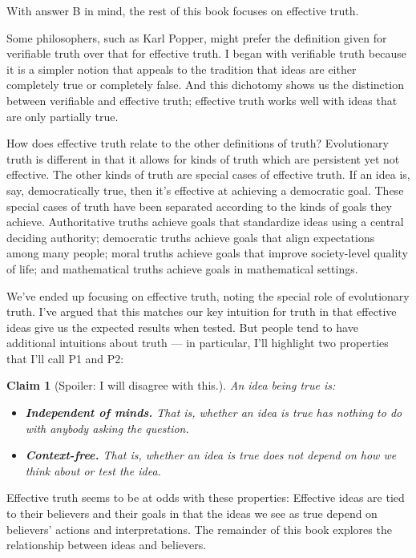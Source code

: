 \documentclass[9pt, twoside]{book}
\newtheorem*{claim}{Claim}
\theoremstyle{argtstyle}
\begin{document}
With answer B in mind, the rest of this book focuses on effective truth.

Some philosophers, such as Karl Popper, might prefer the definition given for
verifiable truth over that for effective truth.
I began with verifiable truth because it is a simpler notion that appeals to the
tradition that ideas are either completely true or completely false.
And this dichotomy shows us the distinction between verifiable and effective
truth; effective truth works well with ideas that are only partially true.

How does effective truth relate to the other definitions of truth?
Evolutionary truth is different in that
it allows for kinds of truth which are persistent yet not effective.
The other kinds of truth are special cases of effective truth.
If an
idea is, say, democratically true, then it's effective at achieving a democratic
goal. These special cases of truth have been separated
according to the kinds of goals they achieve. Authoritative truths achieve goals
that standardize ideas using a central deciding authority; democratic truths
achieve goals that align expectations among many people; moral truths achieve
goals that improve society-level quality of life;
and mathematical truths achieve
goals in mathematical settings.

We've ended up focusing on effective truth, noting the special role of
evolutionary truth. I've argued that this matches our key intuition for truth in
that effective ideas give us the expected results when tested. But people tend
to have additional intuitions about truth --- in
particular, I'll highlight two properties that I'll call
P1 and P2:
\begin{claim}[Spoiler: I will disagree with this.]\label{c7}
    An idea being true is:
\begin{itemize}
    \item{} {\normalfont [{\bf P1.}]}
        {\bf Independent of minds.} That is, whether an idea is true has
        nothing to
        do with anybody asking the question.
    \item{} {\normalfont [{\bf P2.}]}
        {\bf Context-free.} That is, whether an idea is true does not depend
        on
        how we think about or test the idea.
\end{itemize}
\end{claim}
Effective truth seems to be at odds with these properties:
Effective ideas are tied to their believers and their goals in that
the ideas we see as true depend on
believers' actions and interpretations.
The remainder of this
book explores the relationship between ideas and believers.
\end{document}
